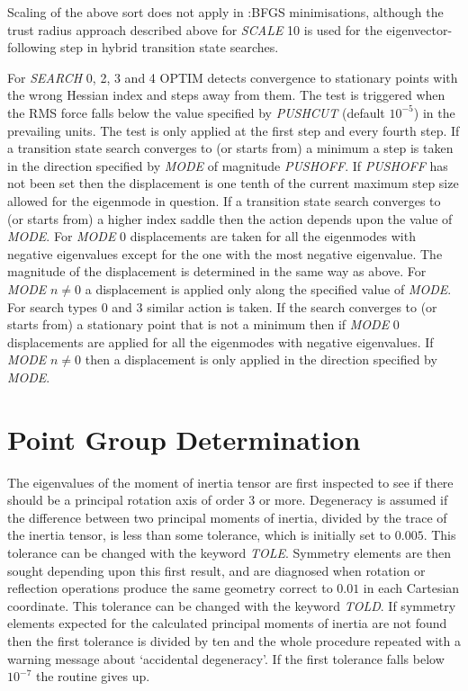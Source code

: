 \documentclass[12pt,a4paper,dvips]{article}
\begin{document}
Scaling of the above sort does not apply in :BFGS minimisations, although the
trust radius approach described above for {\it SCALE\/} 10 is used for the eigenvector-following
step in hybrid transition state searches.

For {\it SEARCH} 0, 2, 3 and 4 OPTIM detects convergence to stationary points with the
wrong Hessian index and steps away from them. The test is triggered when the RMS force
falls below the value specified by {\it PUSHCUT\/} (default $10^{-5}$)
in the prevailing units. The test is only applied at the first step and every fourth step. 
If a transition state search converges to (or starts from) a minimum
a step is taken in the direction specified by {\it MODE\/} of magnitude {\it PUSHOFF\/}.
If {\it PUSHOFF\/} has not been set then the displacement is one tenth of the
current maximum step size allowed for the eigenmode in question.
If a transition state
search converges to (or starts from) a higher index saddle then the action depends upon the
value of {\it MODE\/}. For {\it MODE\/} 0 displacements are taken for all the eigenmodes
with negative eigenvalues except for the one with the most negative eigenvalue. The magnitude
of the displacement is determined in the same way as above.
For {\it MODE\/} $n\not=0$ a displacement is applied only along the specified value of {\it MODE\/}.
For search types 0 and 3 similar action is taken. If the search converges to (or starts from)
a stationary point that is not a minimum then if {\it MODE\/} 0 displacements are applied
for all the eigenmodes with negative eigenvalues. If {\it MODE\/} $n\not=0$ then a displacement
is only applied in the direction specified by {\it MODE\/}.

\section{Point Group Determination}
\label{sec:symmetry}
The eigenvalues
of the moment of inertia tensor are first inspected to see if there should be a principal
rotation axis of order 3 or more. Degeneracy is assumed if the difference between two principal
moments of inertia, divided by the trace of the inertia tensor, is less than some tolerance,
which is initially set to $0.005$. This tolerance can be changed with the keyword {\it TOLE\/}.
Symmetry elements are then sought depending upon this first
result, and are diagnosed when rotation or reflection operations produce the same geometry
correct to $0.01$ in each Cartesian coordinate. This tolerance can be changed with the
keyword {\it TOLD}. If symmetry elements expected for the
calculated principal moments of inertia are not found then the first tolerance is divided by
ten and the whole procedure repeated with a warning message about `accidental degeneracy'. 
If the first tolerance falls below $10^{-7}$ the routine gives up.
\end{document}
